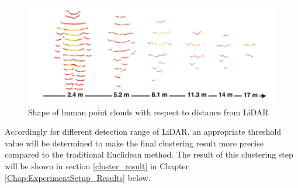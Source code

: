 \begin{figure}[h]
    \centering
    \includegraphics[width=1.0\linewidth]{figures/chap3_fig/euclidean/3_2_2.png}
    \caption{Shape of human point clouds with respect to distance from LiDAR  \cite{online_learning,online_learning_2020}}
    \label{Chap3:Fig8}
\end{figure}

Accordingly for different detection range of LiDAR, an appropriate threshold value
will be determined to make the final clustering result more precise compared to the
traditional Euclidean method. The result of this clustering step will be shown in section
\ref{cluster_result} in Chapter \ref{Chap:ExperimentSetup_Results} below.






